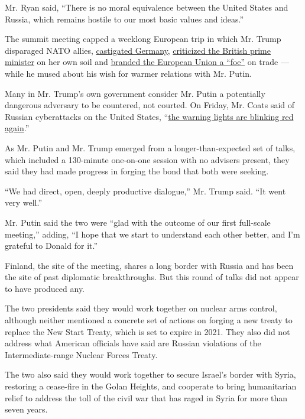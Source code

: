 Mr. Ryan said, ``There is no moral equivalence between the United States
and Russia, which remains hostile to our most basic values and ideas.''

The summit meeting capped a weeklong European trip in which Mr. Trump
disparaged NATO allies,
\href{https://www.nytimes.com/2018/07/11/world/europe/germany-merkel-russia-trump-nato.html}{castigated
Germany},
\href{https://www.nytimes.com/2018/07/12/world/europe/trump-brexit-theresa-may.html}{criticized
the British prime minister} on her own soil and
\href{https://www.nytimes.com/2018/07/15/world/europe/trump-putin-summit-meeting.html?rref=collection\%2Fsectioncollection\%2Fworld\&action=click\&contentCollection=world\&region=rank\&module=package\&version=highlights\&contentPlacement=7\&pgtype=sectionfront}{branded
the European Union a ``foe''} on trade --- while he mused about his wish
for warmer relations with Mr. Putin.

Many in Mr. Trump's own government consider Mr. Putin a potentially
dangerous adversary to be countered, not courted. On Friday, Mr. Coats
said of Russian cyberattacks on the United States,
``\href{https://www.nytimes.com/2018/07/13/us/politics/dan-coats-intelligence-russia-cyber-warning.html}{the
warning lights are blinking red again}.''

As Mr. Putin and Mr. Trump emerged from a longer-than-expected set of
talks, which included a 130-minute one-on-one session with no advisers
present, they said they had made progress in forging the bond that both
were seeking.

``We had direct, open, deeply productive dialogue,'' Mr. Trump said.
``It went very well.''

Mr. Putin said the two were ``glad with the outcome of our first
full-scale meeting,'' adding, ``I hope that we start to understand each
other better, and I'm grateful to Donald for it.''

Finland, the site of the meeting, shares a long border with Russia and
has been the site of past diplomatic breakthroughs. But this round of
talks did not appear to have produced any.

The two presidents said they would work together on nuclear arms
control, although neither mentioned a concrete set of actions on forging
a new treaty to replace the New Start Treaty, which is set to expire in
2021. They also did not address what American officials have said are
Russian violations of the Intermediate-range Nuclear Forces Treaty.

The two also said they would work together to secure Israel's border
with Syria, restoring a cease-fire in the Golan Heights, and cooperate
to bring humanitarian relief to address the toll of the civil war that
has raged in Syria for more than seven years.

